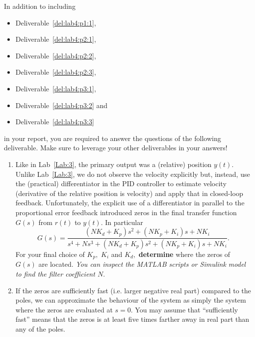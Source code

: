 In addition to including
\begin{itemize}
  \item{Deliverable~\ref{del:lab4:p1:1},}
  \item{Deliverable~\ref{del:lab4:p2:1},}
  \item{Deliverable~\ref{del:lab4:p2:2},}
  \item{Deliverable~\ref{del:lab4:p2:3},}
  \item{Deliverable~\ref{del:lab4:p3:1},}
  \item{Deliverable~\ref{del:lab4:p3:2} and}
  \item{Deliverable~\ref{del:lab4:p3:3}}
\end{itemize}
in your report, you are required to answer the questions of the following deliverable.
Make sure to leverage your other deliverables in your answers!
\begin{deliverable}[label={lab4:report}]
  \begin{enumerate}[label={(\arabic*)}]
    \item{%
      Like in Lab~\ref{Lab:3}, the primary output was a (relative) position \(y(t).\)
      Unlike Lab~\ref{Lab:3}, we do not observe the velocity explicitly but, instead, use the (practical) differentiator in the PID controller to estimate velocity (derivative of the relative position is velocity) and apply that in closed-loop feedback.
      Unfortunately, the explicit use of a differentiator in parallel to the proportional error feedback introduced zeros in the final transfer function \(G(s)\) from \(r(t)\) to \(y(t).\)
      In particular
      \[
        G(s) =
          \frac{
            (N K_d + K_p) s^2 + (N K_p + K_i) s + N K_i
          }{
            s^4 + N s^3 + (N K_d + K_p) s^2 + (N K_p + K_i) s + N K_i
          }.
      \]
      For your final choice of \(K_p,\) \(K_i\) and \(K_d,\) \textbf{determine} where the zeros of \(G(s)\) are located.
      \emph{You can inspect the MATLAB scripts or Simulink model to find the filter coefficient \(N.\)}
      \label{lab4:report:q1}
    }
    \item{%
      If the zeros are sufficiently fast (i.e. larger negative real part) compared to the poles, we can approximate the behaviour of the system as simply the system where the zeros are evaluated at \(s = 0.\)
      You may assume that ``sufficiently fast'' means that the zeros is at least five times farther away in real part than any of the poles.

}
\end{enumerate}
\end{deliverable}
